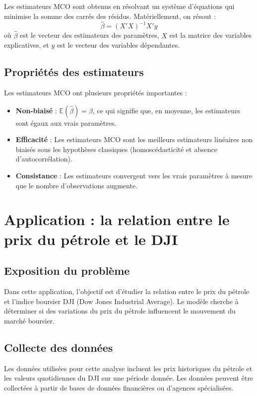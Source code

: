 \documentclass[a4paper,12pt]{article}
\begin{document}
	Les estimateurs MCO sont obtenus en résolvant un système d'équations qui minimise la somme des carrés des résidus. Matériellement, on résout :
	\[
	\hat{\beta} = (X'X)^{-1} X'y
	\]
	où \( \hat{\beta} \) est le vecteur des estimateurs des paramètres, \( X \) est la matrice des variables explicatives, et \( y \) est le vecteur des variables dépendantes.
	
	\subsection{Propriétés des estimateurs}
	
	Les estimateurs MCO ont plusieurs propriétés importantes :
	\begin{itemize}
		\item \textbf{Non-biaisé} : \( \mathbb{E}(\hat{\beta}) = \beta \), ce qui signifie que, en moyenne, les estimateurs sont égaux aux vrais paramètres.
		\item \textbf{Efficacité} : Les estimateurs MCO sont les meilleurs estimateurs linéaires non biaisés sous les hypothèses classiques (homoscédasticité et absence d'autocorrélation).
		\item \textbf{Consistance} : Les estimateurs convergent vers les vrais paramètres à mesure que le nombre d'observations augmente.
	\end{itemize}
	
	\section{Application : la relation entre le prix du pétrole et le DJI}
	
	\subsection{Exposition du problème}
	
	Dans cette application, l’objectif est d’étudier la relation entre le prix du pétrole et l’indice boursier DJI (Dow Jones Industrial Average). Le modèle cherche à déterminer si des variations du prix du pétrole influencent le mouvement du marché boursier.
	
	\subsection{Collecte des données}
	
	Les données utilisées pour cette analyse incluent les prix historiques du pétrole et les valeurs quotidiennes du DJI sur une période donnée. Les données peuvent être collectées à partir de bases de données financières ou d’agences spécialisées.
	
\end{document}
